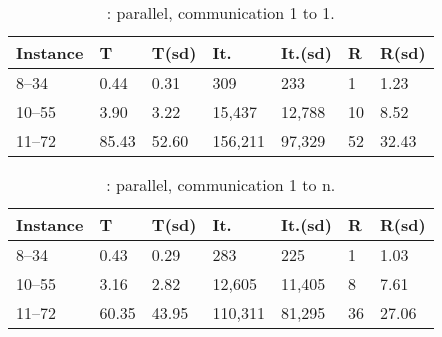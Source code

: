 \begin{table}
	\captionsetup{belowskip=6pt,aboveskip=6pt}
	\centering 
	\renewcommand{\arraystretch}{1}
	\begin{tabular}{p{2cm}|R{1.2cm}R{1.2cm}|R{1.5cm}R{1.5cm}|R{0.8cm}R{1.2cm}}
		\hline 	
		{\bf Instance} & T & T(sd) & It. & It.(sd) & R & R(sd)\\
		\hline
		8--34 & 0.44 & 0.31 & 309 & 233 & 1 & 1.23\\
		10--55 & 3.90 & 3.22 & 15,437 & 12,788 & 10 & 8.52\\
		11--72 & 85.43 & 52.60 & 156,211 & 97,329 & 52 & 32.43\\
		\hline
	\end{tabular}
	\caption{\gr: parallel, communication 1 to 1.}
	\label{tab:golomb_par_1-1}
\end{table}

\begin{table}
	\captionsetup{belowskip=6pt,aboveskip=6pt}
	\centering 
	\renewcommand{\arraystretch}{1}
	\begin{tabular}{p{2cm}|R{1.2cm}R{1.2cm}|R{1.5cm}R{1.5cm}|R{0.8cm}R{1.2cm}}
		\hline 	
		{\bf Instance} & T & T(sd) & It. & It.(sd) & R & R(sd)\\
		\hline
		8--34 & 0.43 & 0.29 & 283 & 225 & 1 & 1.03\\
		10--55 & 3.16 & 2.82 & 12,605 & 11,405 & 8 & 7.61\\
		11--72 & 60.35 & 43.95 & 110,311 & 81,295 & 36 & 27.06\\
		\hline
	\end{tabular}
	\caption{\gr: parallel, communication 1 to n.}
	\label{tab:golomb_par_1-n}
\end{table}